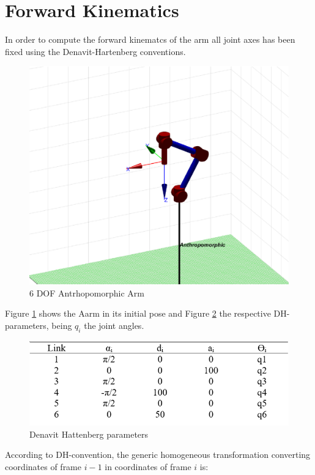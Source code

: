 \section{Forward Kinematics}

In order to compute the forward kinematcs of the arm all joint axes has been fixed using the Denavit-Hartenberg conventions.

\begin{figure}[h]
\centering
\includegraphics[width=0.8\linewidth]{img/aarm}
\caption{6 DOF Antrhopomorphic Arm}
\label{fig:aarm}
\end{figure}

Figure \ref{fig:aarm} shows the Aarm in its initial pose and Figure \ref{fig:dhtable} the respective DH-parameters, being $q_{i}$ the joint angles.

\begin{figure}[h]
\centering
\includegraphics[width=0.8\linewidth]{img/dhtable}
\caption{Denavit Hattenberg parameters}
\label{fig:dhtable}
\end{figure}

According to DH-convention, the generic homogeneous transformation converting coordinates of frame $i-1$ in coordinates of frame $i$  
is:

